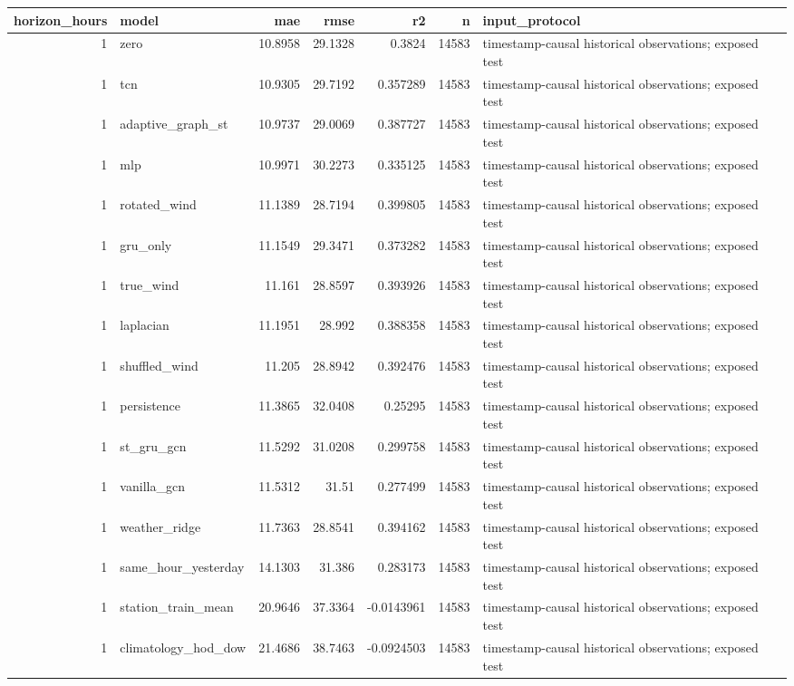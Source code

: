 \begin{tabular}{rlrrrrl}
\hline
horizon\_hours & model & mae & rmse & r2 & n & input\_protocol \\
\hline
1 & zero & 10.8958 & 29.1328 & 0.3824 & 14583 & timestamp-causal historical observations; exposed test \\
1 & tcn & 10.9305 & 29.7192 & 0.357289 & 14583 & timestamp-causal historical observations; exposed test \\
1 & adaptive\_graph\_st & 10.9737 & 29.0069 & 0.387727 & 14583 & timestamp-causal historical observations; exposed test \\
1 & mlp & 10.9971 & 30.2273 & 0.335125 & 14583 & timestamp-causal historical observations; exposed test \\
1 & rotated\_wind & 11.1389 & 28.7194 & 0.399805 & 14583 & timestamp-causal historical observations; exposed test \\
1 & gru\_only & 11.1549 & 29.3471 & 0.373282 & 14583 & timestamp-causal historical observations; exposed test \\
1 & true\_wind & 11.161 & 28.8597 & 0.393926 & 14583 & timestamp-causal historical observations; exposed test \\
1 & laplacian & 11.1951 & 28.992 & 0.388358 & 14583 & timestamp-causal historical observations; exposed test \\
1 & shuffled\_wind & 11.205 & 28.8942 & 0.392476 & 14583 & timestamp-causal historical observations; exposed test \\
1 & persistence & 11.3865 & 32.0408 & 0.25295 & 14583 & timestamp-causal historical observations; exposed test \\
1 & st\_gru\_gcn & 11.5292 & 31.0208 & 0.299758 & 14583 & timestamp-causal historical observations; exposed test \\
1 & vanilla\_gcn & 11.5312 & 31.51 & 0.277499 & 14583 & timestamp-causal historical observations; exposed test \\
1 & weather\_ridge & 11.7363 & 28.8541 & 0.394162 & 14583 & timestamp-causal historical observations; exposed test \\
1 & same\_hour\_yesterday & 14.1303 & 31.386 & 0.283173 & 14583 & timestamp-causal historical observations; exposed test \\
1 & station\_train\_mean & 20.9646 & 37.3364 & -0.0143961 & 14583 & timestamp-causal historical observations; exposed test \\
1 & climatology\_hod\_dow & 21.4686 & 38.7463 & -0.0924503 & 14583 & timestamp-causal historical observations; exposed test \\

\end{tabular}
